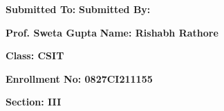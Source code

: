 \documentclass[12pt,,a4paper]{article}
\begin{document}







\vspace*{2cm}

\textbf{\fontsize{14}{\baselineskip}\selectfont Submitted To:} 
 \hspace{\fill} 
\textbf{\fontsize{14}{\baselineskip}\selectfont Submitted By:} 


\bigskip

\textbf{\fontsize{14}{\baselineskip}\selectfont Prof. Sweta Gupta}
\hspace{\fill}
\textbf{\fontsize{14}{\baselineskip}\selectfont Name: Rishabh Rathore }

\bigskip

\hspace{8cm}\textbf{\fontsize{14}{\baselineskip}\selectfont Class: CSIT}

\bigskip


\hspace{8cm}\textbf{\fontsize{14}{\baselineskip}\selectfont Enrollment No: 0827CI211155}

\bigskip

\hspace{8cm}\textbf{\fontsize{14}{\baselineskip}\selectfont Section: III}

\clearpage

\end{document}
